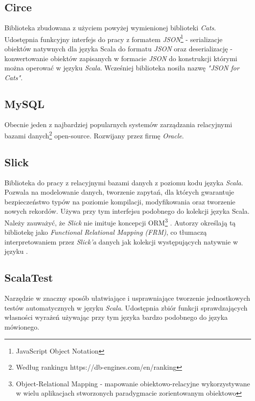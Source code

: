 \documentclass[../main.tex]{subfiles}
\begin{document}
\subsection{Circe}
Biblioteka zbudowana z użyciem powyżej wymienionej biblioteki \textit{Cats}. Udostępnia funkcyjny interfejs do pracy z formatem \textit{JSON}\footnote{JavaScript Object Notation} - serializacje obiektów natywnych dla języka Scala do formatu \textit{JSON} oraz deserializację - konwertowanie obiektów zapisanych w formacie \textit{JSON} do konstrukcji którymi można operować w języku \textit{Scala}. Wcześniej biblioteka nosiła nazwę \textit{"JSON for Cats"}.

\subsection{MySQL}
Obecnie jeden z najbardziej popularnych systemów zarządzania relacyjnymi bazami danych\footnote{Według rankingu https://db-engines.com/en/ranking} open-source. Rozwijany przez firmę \textit{Oracle}.

\subsection{Slick}
Biblioteka do pracy z relacyjnymi bazami danych z poziomu kodu języka \textit{Scala}. Pozwala na modelowanie danych, tworzenie zapytań, dla których gwarantuje bezpieczeństwo typów na poziomie kompilacji, modyfikowania oraz tworzenie nowych rekordów. Używa przy tym interfejsu podobnego do kolekcji języka Scala. Należy zauważyć, że \textit{Slick} nie imituje koncepcji ORM\footnote{Object-Relational Mapping - mapowanie obiektowo-relacyjne wykorzystywane w wielu aplikacjach stworzonych paradygmacie zorientowanym obiektowo} \cite{BOOK:EssentialSlick}. Autorzy określają tą bibliotekę jako \textit{Functional Relational Mapping (FRM)}, co tłumaczą interpretowaniem przez \textit{Slick'a} danych jak kolekcji występujących natywnie w języku \cite{WEBSITE:SlickDocs}.

\subsection{ScalaTest}
Narzędzie w znaczny sposób ułatwiające i usprawniające tworzenie jednostkowych testów automatycznych w języku \textit{Scala}. Udostępnia zbiór funkcji sprawdzających własności wyrażeń używając przy tym języka bardzo podobnego do języka mówionego.
\end{document}
